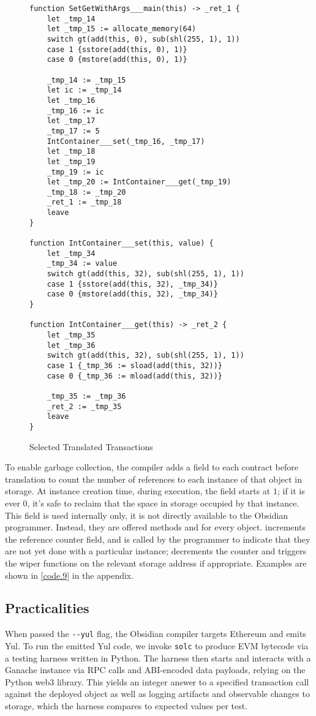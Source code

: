 \begin{figure}[hbtp]
    \caption{Selected Translated Transactions}
    \label{code.8}
    \begin{lstlisting}[language=yul,frame=single]
function SetGetWithArgs___main(this) -> _ret_1 {
    let _tmp_14
    let _tmp_15 := allocate_memory(64)
    switch gt(add(this, 0), sub(shl(255, 1), 1))
    case 1 {sstore(add(this, 0), 1)}
    case 0 {mstore(add(this, 0), 1)}

    _tmp_14 := _tmp_15
    let ic := _tmp_14
    let _tmp_16
    _tmp_16 := ic
    let _tmp_17
    _tmp_17 := 5
    IntContainer___set(_tmp_16, _tmp_17)
    let _tmp_18
    let _tmp_19
    _tmp_19 := ic
    let _tmp_20 := IntContainer___get(_tmp_19)
    _tmp_18 := _tmp_20
    _ret_1 := _tmp_18
    leave
}

function IntContainer___set(this, value) {
    let _tmp_34
    _tmp_34 := value
    switch gt(add(this, 32), sub(shl(255, 1), 1))
    case 1 {sstore(add(this, 32), _tmp_34)}
    case 0 {mstore(add(this, 32), _tmp_34)}
}

function IntContainer___get(this) -> _ret_2 {
    let _tmp_35
    let _tmp_36
    switch gt(add(this, 32), sub(shl(255, 1), 1))
    case 1 {_tmp_36 := sload(add(this, 32))}
    case 0 {_tmp_36 := mload(add(this, 32))}

    _tmp_35 := _tmp_36
    _ret_2 := _tmp_35
    leave
}
    \end{lstlisting}
\end{figure}

To enable garbage collection, the compiler adds a field to each contract
before translation to count the number of references to each instance of
that object in storage. At instance creation time, during execution, the
field starts at $1$; if it is ever $0$, it's safe to reclaim that the space
in storage occupied by that instance. This field is used internally only,
it is not directly available to the Obsidian programmer. Instead, they are
offered methods  and  for every
object.  increments the reference counter field, and is
called by the programmer to indicate that they are not yet done with a
particular instance;  decrements the counter and triggers
the wiper functions on the relevant storage address if appropriate. Examples are shown in \cref{code.9} in the appendix.


\subsection{Practicalities}
When passed the \texttt{-{}-yul} flag, the Obsidian compiler targets Ethereum and emits Yul. To run the emitted Yul code, we invoke \texttt{solc} to produce EVM
bytecode via a testing harness written in Python. The harness then starts
and interacts with a Ganache instance via RPC calls and ABI-encoded data
payloads, relying on the Python web3 library. This yields an integer answer
to a specified transaction call against the deployed object as well as
logging artifacts and observable changes to storage, which the harness
compares to expected values per test.